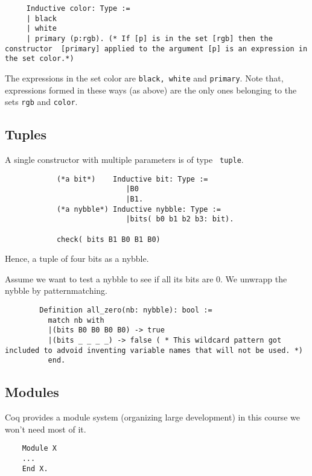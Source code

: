 	 \begin{lstlisting}
	 Inductive color: Type := 
	 | black
	 | white
	 | primary (p:rgb). (* If [p] is in the set [rgb] then the constructor  [primary] applied to the argument [p] is an expression in the set color.*) 
	 \end{lstlisting}
	 
	 The expressions in the set color are \lstinline!black, white! and \lstinline!primary!.
	 Note that, expressions formed in these ways (as above) are the only ones belonging to the sets \lstinline!rgb! and \lstinline!color!.
	 

\subsection{Tuples}

    A single constructor with multiple parameters is of type \lstinline! tuple!.
	\begin{example}
 	 	\begin{lstlisting}
 	 		(*a bit*)    Inductive bit: Type := 
 	 						|B0
 	 						|B1.
 		    (*a nybble*) Inductive nybble: Type := 
 		   				 	|bits( b0 b1 b2 b3: bit).
 		   				 	
 		   	check( bits B1 B0 B1 B0)
 		\end{lstlisting}
 		Hence, a tuple of four bits as a nybble.
 		
 		Assume we want to test a nybble to see if all its bits are 0. We unwrapp the nybble by patternmatching.
 		\begin{lstlisting}
 		Definition all_zero(nb: nybble): bool :=
 		  match nb with
 		  |(bits B0 B0 B0 B0) -> true
 		  |(bits _ _ _ _) -> false ( * This wildcard pattern got included to advoid inventing variable names that will not be used. *) 
 		  end.
 		 \end{lstlisting}
 	\end{example}
 	

\subsection{Modules}
	Coq provides a module system (organizing large development) in this course we won't need most of it.
	\begin{lstlisting}
	Module X 
	...
	End X.
	\end{lstlisting}

